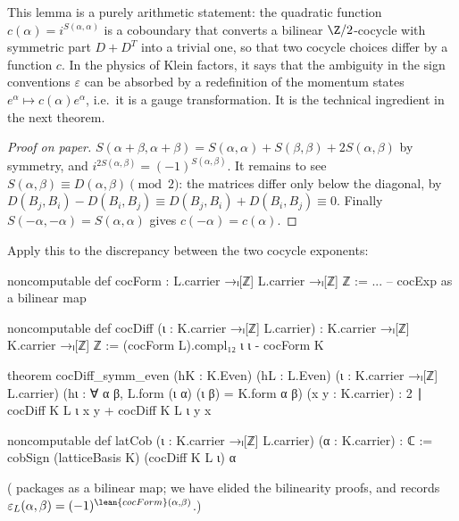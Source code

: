 \begin{physics}
This lemma is a purely arithmetic statement: the quadratic function $c(\alpha)=i^{S(\alpha,\alpha)}$ is a coboundary that converts a bilinear $\Z/2$-cocycle with symmetric part $D+D^T$ into a trivial one, so that two cocycle choices differ by a function $c$. In the physics of Klein factors, it says that the ambiguity in the sign conventions $\varepsilon$ can be absorbed by a redefinition of the momentum states $e^\alpha\mapsto c(\alpha)e^\alpha$, i.e.\ it is a gauge transformation. It is the technical ingredient in the next theorem.
\end{physics}
\begin{proof}[Proof on paper]
$S(\alpha+\beta,\alpha+\beta)=S(\alpha,\alpha)+S(\beta,\beta)+2S(\alpha,\beta)$ by symmetry, and
$i^{2S(\alpha,\beta)}=(-1)^{S(\alpha,\beta)}$. It remains to see $S(\alpha,\beta)\equiv D(\alpha,
\beta)\pmod2$: the matrices differ only below the diagonal, by $D(B_j,B_i)-D(B_i,B_j)\equiv
D(B_j,B_i)+D(B_i,B_j)\equiv0$. Finally $S(-\alpha,-\alpha)=S(\alpha,\alpha)$ gives $c(-\alpha)=
c(\alpha)$.
\end{proof}

Apply this to the discrepancy between the two cocycle exponents:
\begin{leancode}
noncomputable def cocForm : L.carrier →ₗ[ℤ] L.carrier →ₗ[ℤ] ℤ := ...   -- cocExp as a bilinear map

noncomputable def cocDiff (ι : K.carrier →ₗ[ℤ] L.carrier) : K.carrier →ₗ[ℤ] K.carrier →ₗ[ℤ] ℤ :=
  (cocForm L).compl₁₂ ι ι - cocForm K

theorem cocDiff_symm_even (hK : K.Even) (hL : L.Even) (ι : K.carrier →ₗ[ℤ] L.carrier)
    (hι : ∀ α β, L.form (ι α) (ι β) = K.form α β) (x y : K.carrier) :
    2 ∣ cocDiff K L ι x y + cocDiff K L ι y x

noncomputable def latCob (ι : K.carrier →ₗ[ℤ] L.carrier) (α : K.carrier) : ℂ :=
  cobSign (latticeBasis K) (cocDiff K L ι) α
\end{leancode}
( packages  as a bilinear map; we have elided the
bilinearity proofs, and  records
$\varepsilon_L(\alpha,\beta)=(-1)^{\lean{cocForm}(\alpha,\beta)}$.)

